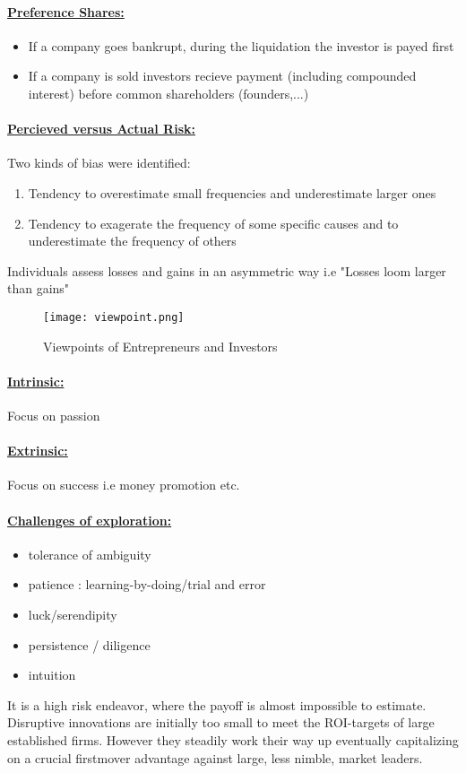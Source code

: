 \documentclass[8pt]{extreport}
\begin{document}
{\paragraph{\underline{Preference Shares:}}
\begin{itemize}
\item If a company goes bankrupt, during the liquidation the investor is payed first
\item If a company is sold investors recieve payment (including compounded interest) before common shareholders (founders,...)
\end{itemize}
\paragraph{\underline{Percieved versus Actual Risk:}} Two kinds of bias were identified:
\begin{enumerate}
\item Tendency to overestimate small frequencies and underestimate larger ones
\item Tendency to exagerate the frequency of some specific causes and to underestimate the frequency of others
\end{enumerate}
Individuals assess losses and gains in an asymmetric way i.e "Losses loom larger than gains"
\begin{figure}[h!]
  \texttt{[image: viewpoint.png]}
  \caption{Viewpoints of Entrepreneurs and Investors}
  \label{fig:viewpoints}
\end{figure}
\paragraph{\underline{Intrinsic:}} Focus on passion
\paragraph{\underline{Extrinsic:}} Focus on success i.e money promotion etc.
\paragraph{\underline{Challenges of exploration:}}
\begin{itemize}
\item tolerance of ambiguity
\item patience : learning-by-doing/trial and error
\item luck/serendipity
\item persistence / diligence
\item intuition
\end{itemize}
It is a high risk endeavor, where the payoff is almost impossible to estimate. Disruptive innovations are initially too small to meet the ROI-targets of large established firms. However they steadily work their way up eventually capitalizing on a crucial firstmover advantage against large, less nimble, market leaders.
}
\end{document}
